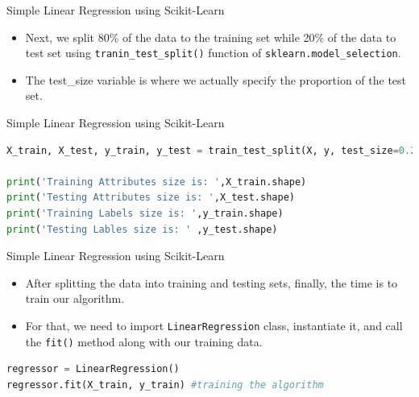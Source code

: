 \documentclass[12pt,xcolor={dvipsnames}]{beamer}
\begin{document}
\begin{frame}{Simple Linear Regression using Scikit-Learn}
\begin{itemize}
\item Next, we split 80\% of the data to the training set while 20\% of the data to test set using \lstinline[language=Python]!tranin_test_split()! function of \lstinline[language=Python]!sklearn.model_selection!.
\item The test\_size variable is where we actually specify the proportion of the test set.
\end{itemize}
\end{frame}

\begin{frame}[fragile]{Simple Linear Regression using Scikit-Learn}
\begin{lstlisting}[language=Python]
X_train, X_test, y_train, y_test = train_test_split(X, y, test_size=0.2, random_state=0)

print('Training Attributes size is: ',X_train.shape)
print('Testing Attributes size is: ',X_test.shape)
print('Training Labels size is: ',y_train.shape)
print('Testing Lables size is: ' ,y_test.shape)
\end{lstlisting}
\end{frame}

\begin{frame}[fragile]{Simple Linear Regression using Scikit-Learn}
\begin{itemize}
\item After splitting the data into training and testing sets, finally, the time is to train our algorithm.
\item For that, we need to import \lstinline[language=Python]!LinearRegression! class, instantiate it, and call the \lstinline[language=Python]!fit()! method along with our training data.
\end{itemize}
\begin{lstlisting}[language=Python]
regressor = LinearRegression()
regressor.fit(X_train, y_train) #training the algorithm
\end{lstlisting}
\end{frame}
\end{document}
